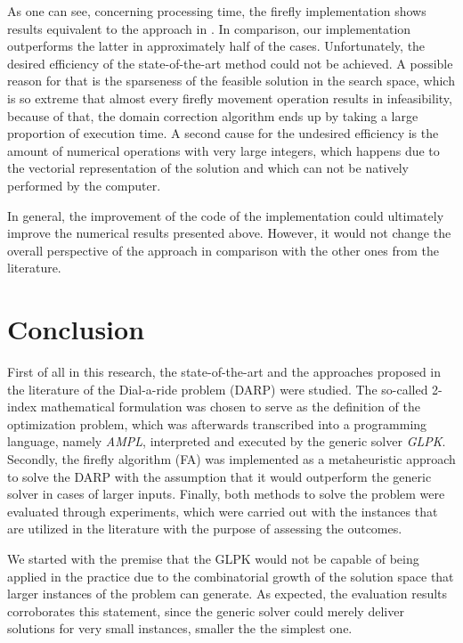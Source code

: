 \documentclass[tuberlin,cic,tc,openright,english,noabntcite,oneside]{iiufrgs}
\begin{document}
As one can see, concerning processing time, the firefly implementation shows results equivalent to the approach in  \textcite{parragh_introducing_2011}. In comparison, our implementation outperforms the latter in approximately half of the cases. Unfortunately, the desired efficiency of the state-of-the-art method could not be achieved. A possible reason for that is the sparseness of the feasible solution in the search space, which is so extreme that almost every firefly movement operation results in infeasibility, because of that, the domain correction algorithm ends up by taking a large proportion of execution time. A second cause for the undesired efficiency is the amount  of numerical operations with very large integers, which happens due to the vectorial representation of the solution and which can not be natively performed by the computer.

In general, the improvement of the code of the implementation could ultimately improve the numerical results presented above. However, it would not change the overall perspective of the approach in comparison with the other ones from the literature.

\chapter{Conclusion}
First of all in this research, the state-of-the-art and the approaches proposed in the literature of the Dial-a-ride problem (DARP) were studied. The so-called 2-index mathematical formulation was chosen to serve as the definition of the optimization problem, which was afterwards transcribed into a programming language, namely \emph{AMPL}, interpreted and executed by the generic solver \emph{GLPK}. Secondly, the firefly algorithm (FA) was implemented as a metaheuristic approach to solve the DARP with the assumption that it would outperform the generic solver in cases of larger inputs. Finally, both methods to solve the problem were evaluated through experiments, which were carried out with the instances that are utilized in the literature with the purpose of assessing the outcomes.

We started with the premise that the GLPK would not be capable of being applied in the practice due to the combinatorial growth of the solution space that larger instances of the problem can generate. As expected, the evaluation results corroborates this statement, since the generic solver could merely deliver solutions for very small instances, smaller the the simplest one.
\end{document}
